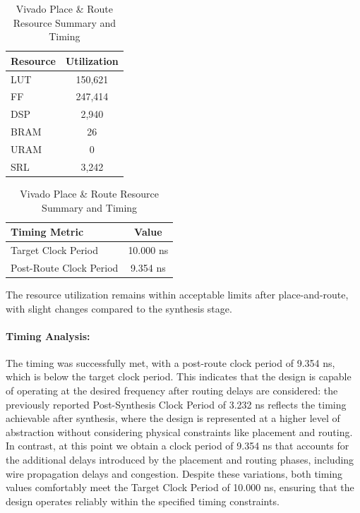 \documentclass{article}
\begin{document}
\begin{table}[H]
    \centering
    \label{tab:place-route-results}
    \begin{tabular}{|l|c|}
        \hline
        \textbf{Resource} & \textbf{Utilization} \\
        \hline
        LUT & 150,621 \\
        FF & 247,414 \\
        DSP & 2,940 \\
        BRAM & 26 \\
        URAM & 0 \\
        SRL & 3,242 \\
        \hline
    \end{tabular}

    \vspace{5mm}

    \begin{tabular}{|l|c|}
        \hline
        \textbf{Timing Metric} & \textbf{Value} \\
        \hline
        Target Clock Period & 10.000 ns \\
        Post-Route Clock Period & 9.354 ns \\
        \hline
    \end{tabular}
    \caption{Vivado Place \& Route Resource Summary and Timing}
\end{table}

The resource utilization remains within acceptable limits after place-and-route, with slight changes compared to the synthesis stage. \paragraph{Timing Analysis:} The timing was successfully met, with a post-route clock period of 9.354 ns, which is below the target clock period. This indicates that the design is capable of operating at the desired frequency after routing delays are considered: the previously reported Post-Synthesis Clock Period of 3.232 ns reflects the timing achievable after synthesis, where the design is represented at a higher level of abstraction without considering physical constraints like placement and routing. In contrast, at this point we obtain a clock period of 9.354 ns that accounts for the additional delays introduced by the placement and routing phases, including wire propagation delays and congestion. Despite these variations, both timing values comfortably meet the Target Clock Period of 10.000 ns, ensuring that the design operates reliably within the specified timing constraints.
\end{document}
